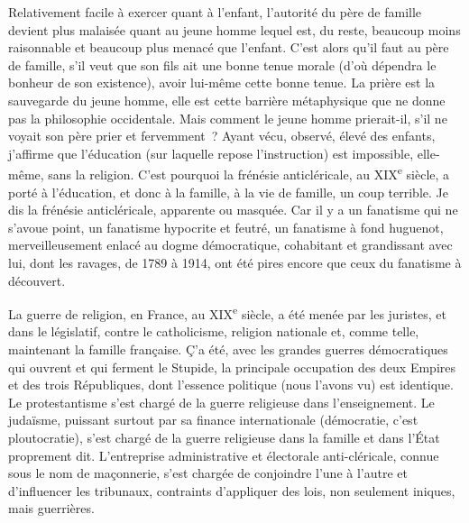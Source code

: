 \documentclass[french,twoside]{book} %
\begin{document}
Relativement facile à exercer quant à l’enfant, l’autorité du père de famille devient plus malaisée quant au jeune homme lequel est, du reste, beaucoup moins raisonnable et beaucoup plus menacé que l’enfant. C’est alors qu’il faut au père de famille, s’il veut que son fils ait une bonne tenue morale (d’où dépendra le bonheur de son existence), avoir lui-même cette bonne tenue. La prière est la sauvegarde du jeune homme, elle est cette barrière métaphysique que ne donne pas la philosophie occidentale. Mais comment le jeune homme prierait-il, s’il ne voyait son père prier et fervemment ? Ayant vécu, observé, élevé des enfants, j’affirme que l’éducation (sur laquelle repose l’instruction) est impossible, elle-même, sans la religion. C’est pourquoi la frénésie anticléricale, au XIX\textsuperscript{e} siècle, a porté à l’éducation, et donc à la famille, à la vie de famille, un coup terrible. Je dis la frénésie anticléricale, apparente ou masquée. Car il y a un fanatisme qui ne s’avoue point, un fanatisme hypocrite et feutré, un fanatisme à fond huguenot, merveilleusement enlacé au dogme démocratique, cohabitant et grandissant avec lui, dont les ravages, de 1789 à 1914, ont été pires encore que ceux du fanatisme à découvert.\par
La guerre de religion, en France, au XIX\textsuperscript{e} siècle, a été menée par les juristes, et dans le législatif, contre le catholicisme, religion nationale et, comme telle, maintenant la famille française. Ç’a été, avec les grandes guerres démocratiques qui ouvrent et qui ferment le Stupide, la principale occupation des deux Empires et des trois Républiques, dont l’essence politique (nous l’avons vu) est identique. Le protestantisme s’est chargé de la guerre religieuse dans l’enseignement. Le judaïsme, puissant surtout par sa finance internationale (démocratie, c’est ploutocratie), s’est chargé de la guerre religieuse dans la famille et dans l’État proprement dit. L’entreprise administrative et électorale anti-cléricale, connue sous le nom de maçonnerie, s’est chargée de conjoindre l’une à l’autre et d’influencer les tribunaux, contraints d’appliquer des lois, non seulement iniques, mais guerrières.\par
\end{document}
